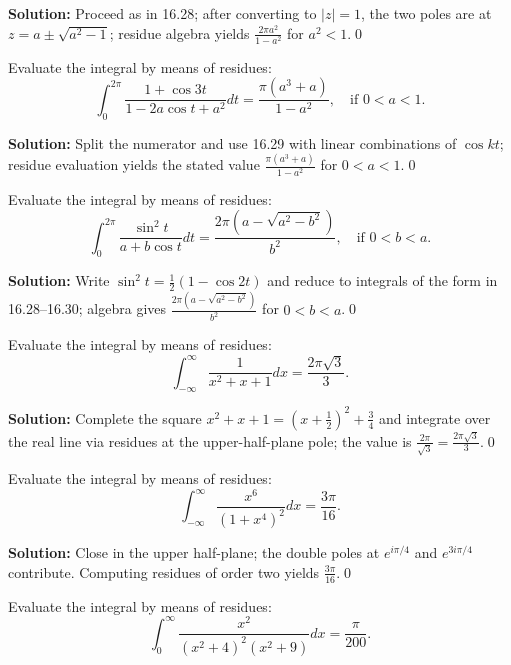 \bigskip\noindent\textbf{Solution:}
Proceed as in 16.28; after converting to $|z|=1$, the two poles are at $z=a\pm\sqrt{a^2-1}$; residue algebra yields $\frac{2\pi a^2}{1-a^2}$ for $a^2<1$.\qed


\begin{problembox}
Evaluate the integral by means of residues:
\[ \int_0^{2\pi} \frac{1 + \cos 3t}{1 - 2a \cos t + a^2} dt = \frac{\pi (a^3 + a)}{1 - a^2}, \quad \text{if } 0 < a < 1. \]
\end{problembox}

\bigskip\noindent\textbf{Solution:}
Split the numerator and use 16.29 with linear combinations of $\cos kt$; residue evaluation yields the stated value $\frac{\pi(a^3+a)}{1-a^2}$ for $0<a<1$.\qed


\begin{problembox}
Evaluate the integral by means of residues:
\[ \int_0^{2\pi} \frac{\sin^2 t}{a + b \cos t} dt = \frac{2\pi (a - \sqrt{a^2 - b^2})}{b^2}, \quad \text{if } 0 < b < a. \]
\end{problembox}

\bigskip\noindent\textbf{Solution:}
Write $\sin^2 t=\tfrac{1}{2}(1-\cos 2t)$ and reduce to integrals of the form in 16.28–16.30; algebra gives $\frac{2\pi(a-\sqrt{a^2-b^2})}{b^2}$ for $0<b<a$.\qed


\begin{problembox}
Evaluate the integral by means of residues:
\[ \int_{-\infty}^{\infty} \frac{1}{x^2 + x + 1} dx = \frac{2\pi \sqrt{3}}{3}. \]
\end{problembox}

\bigskip\noindent\textbf{Solution:}
Complete the square $x^2+x+1=(x+\tfrac12)^2+\tfrac34$ and integrate over the real line via residues at the upper-half-plane pole; the value is $\frac{2\pi}{\sqrt{3}}=\frac{2\pi\sqrt{3}}{3}$.\qed


\begin{problembox}
Evaluate the integral by means of residues:
\[ \int_{-\infty}^{\infty} \frac{x^6}{(1 + x^4)^2} dx = \frac{3\pi}{16}. \]
\end{problembox}

\bigskip\noindent\textbf{Solution:}
Close in the upper half-plane; the double poles at $e^{i\pi/4}$ and $e^{3i\pi/4}$ contribute. Computing residues of order two yields $\frac{3\pi}{16}$.\qed


\begin{problembox}
Evaluate the integral by means of residues:
\[ \int_0^{\infty} \frac{x^2}{(x^2 + 4)^2 (x^2 + 9)} dx = \frac{\pi}{200}. \]
\end{problembox}

